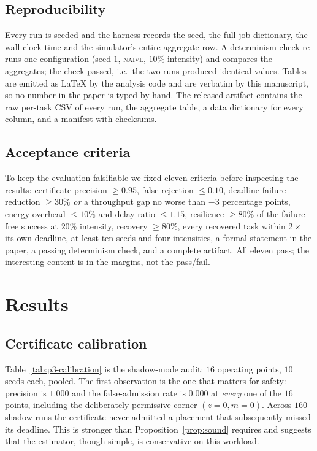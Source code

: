 \documentclass[journal,10pt]{IEEEtran}
\begin{document}
\subsection{Reproducibility}
Every run is seeded and the harness records the seed, the full job dictionary,
the wall-clock time and the simulator's entire aggregate row. A determinism
check re-runs one configuration (seed $1$, \textsc{naive}, $10\%$ intensity) and
compares the aggregates; the check passed, i.e.\ the two runs produced
identical values. Tables are emitted as LaTeX by the analysis code and are
\verb|| verbatim by this manuscript, so no number in the paper is typed
by hand. The released artifact contains the raw per-task CSV of every run, the
aggregate table, a data dictionary for every column, and a manifest with
checksums.

\subsection{Acceptance criteria}
To keep the evaluation falsifiable we fixed eleven criteria before inspecting
the results: certificate precision $\ge0.95$, false rejection $\le0.10$,
deadline-failure reduction $\ge30\%$ \emph{or} a throughput gap no worse than
$-3$ percentage points, energy overhead $\le10\%$ and delay ratio $\le1.15$,
resilience $\ge80\%$ of the failure-free success at $20\%$ intensity, recovery
$\ge80\%$, every recovered task within $2\times$ its own deadline, at least ten
seeds and four intensities, a formal statement in the paper, a passing
determinism check, and a complete artifact. All eleven pass; the interesting
content is in the margins, not the pass/fail.

\section{Results}
\label{sec:results}

\subsection{Certificate calibration}
\label{sec:res-calib}
Table~\ref{tab:p3-calibration} is the shadow-mode audit: $16$ operating points,
$10$ seeds each, pooled. The first observation is the one that matters for
safety: precision is $1.000$ and the false-admission rate is $0.000$ at
\emph{every} one of the $16$ points, including the deliberately permissive
corner $(z=0,m=0)$. Across $160$ shadow runs the certificate never admitted a
placement that subsequently missed its deadline. This is stronger than
Proposition~\ref{prop:sound} requires and suggests that the estimator, though
simple, is conservative on this workload.
\end{document}
